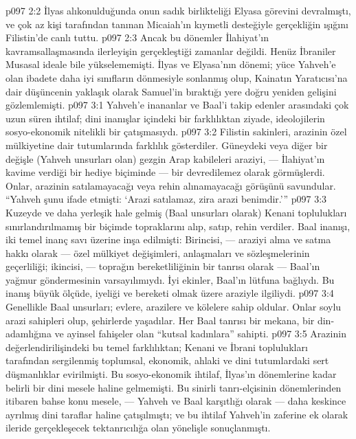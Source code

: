 \vs p097 2:2 İlyas alıkonulduğunda onun sadık birlikteliği Elyasa görevini devralmıştı, ve çok az kişi tarafından tanınan Micaiah’ın kıymetli desteğiyle gerçekliğin ışığını Filistin’de canlı tuttu.
\vs p097 2:3 Ancak bu dönemler İlahiyat’ın kavramsallaşmasında ilerleyişin gerçekleştiği zamanlar değildi. Henüz İbraniler Musasal ideale bile yükselememişti. İlyas ve Elyasa’nın dönemi; yüce Yahveh’e olan ibadete daha iyi sınıfların dönmesiyle sonlanmış olup, Kainatın Yaratıcısı’na dair düşüncenin yaklaşık olarak Samuel’in bıraktığı yere doğru yeniden gelişini gözlemlemişti.
\vs p097 3:1 Yahveh’e inananlar ve Baal’i takip edenler arasındaki çok uzun süren ihtilaf; dini inanışlar içindeki bir farklılıktan ziyade, ideolojilerin sosyo\hyp{}ekonomik nitelikli bir çatışmasıydı.
\vs p097 3:2 Filistin sakinleri, arazinin özel mülkiyetine dair tutumlarında farklılık gösterdiler. Güneydeki veya diğer bir değişle (Yahveh unsurları olan) gezgin Arap kabileleri araziyi, --- İlahiyat’ın kavime verdiği bir hediye biçiminde --- bir devredilemez olarak görmüşlerdi. Onlar, arazinin satılamayacağı veya rehin alınamayacağı görüşünü savundular. “Yahveh şunu ifade etmişti: ‘Arazi satılamaz, zira arazi benimdir.’”
\vs p097 3:3 Kuzeyde ve daha yerleşik hale gelmiş (Baal unsurları olarak) Kenani toplulukları sınırlandırılmamış bir biçimde topraklarını alıp, satıp, rehin verdiler. Baal inanışı, iki temel inanç savı üzerine inşa edilmişti: Birincisi, --- araziyi alma ve satma hakkı olarak --- özel mülkiyet değişimleri, anlaşmaları ve sözleşmelerinin geçerliliği; ikincisi, --- toprağın bereketliliğinin bir tanrısı olarak --- Baal’ın yağmur göndermesinin varsayılımıydı. İyi ekinler, Baal’ın lütfuna bağlıydı. Bu inanış büyük ölçüde, iyeliği ve bereketi olmak üzere araziyle ilgiliydi.
\vs p097 3:4 Genellikle Baal unsurları; evlere, arazilere ve kölelere sahip oldular. Onlar soylu arazi sahipleri olup, şehirlerde yaşadılar. Her Baal tanrısı bir mekana, bir din\hyp{}adamlığına ve ayinsel fahişeler olan “kutsal kadınlara” sahipti.
\vs p097 3:5 Arazinin değerlendirilişindeki bu temel farklılıktan; Kenani ve İbrani toplulukları tarafından sergilenmiş toplumsal, ekonomik, ahlaki ve dini tutumlardaki sert düşmanlıklar evirilmişti. Bu sosyo\hyp{}ekonomik ihtilaf, İlyas’ın dönemlerine kadar belirli bir dini mesele haline gelmemişti. Bu sinirli tanrı\hyp{}elçisinin dönemlerinden itibaren bahse konu mesele, --- Yahveh ve Baal karşıtlığı olarak --- daha keskince ayrılmış dini taraflar haline çatışılmıştı; ve bu ihtilaf Yahveh’in zaferine ek olarak ileride gerçekleşecek tektanrıcılığa olan yönelişle sonuçlanmıştı.

